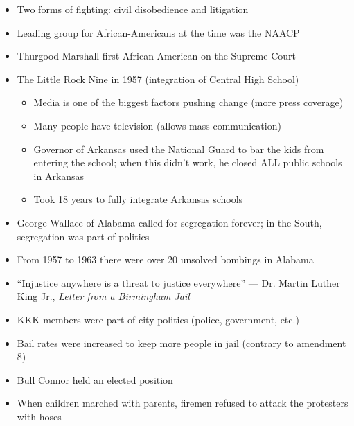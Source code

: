 \documentclass[12pt]{article}
\begin{document}
\begin{itemize}
  \item Two forms of fighting: civil disobedience and litigation

  \item Leading group for African-Americans at the time was the NAACP

  \item Thurgood Marshall first African-American on the Supreme Court

  \item The Little Rock Nine in 1957 (integration of Central High School)

    \begin{itemize}

      \item Media is one of the biggest factors pushing change (more press coverage)

      \item Many people have television (allows mass communication)

      \item Governor of Arkansas used the National Guard to bar the kids from entering the school; when this didn't work, he closed ALL public schools in Arkansas

      \item Took 18 years to fully integrate Arkansas schools

    \end{itemize}

  \item George Wallace of Alabama called for segregation forever; in the South, segregation was part of politics

  \item From 1957 to 1963 there were over 20 unsolved bombings in Alabama

  \item “Injustice anywhere is a threat to justice everywhere” — Dr. Martin Luther King Jr., \textit{Letter from a Birmingham Jail}

  \item KKK members were part of city politics (police, government, etc.)

  \item Bail rates were increased to keep more people in jail (contrary to amendment 8)

  \item Bull Connor held an elected position

  \item When children marched with parents, firemen refused to attack the protesters with hoses


\end{itemize}
\end{document}
